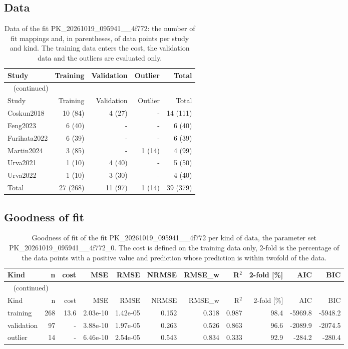 \subsection{Data}

\begin{longtable}{lrrrr}
\caption{Data of the fit PK\_20261019\_095941\_\_4f772: the number of fit mappings and, in parentheses, of data points per study and kind. The training data enters the cost, the validation data and the outliers are evaluated only.}\label{tab:data:PK_20261019_095941__4f772} \\
\toprule
Study & Training & Validation & Outlier & Total \\
\midrule
\endfirsthead
\multicolumn{5}{l}{\small\tablename~\thetable{} (continued)} \\
\toprule
Study & Training & Validation & Outlier & Total \\
\midrule
\endhead
\bottomrule
\endlastfoot
Coskun2018 & 10 (84) & 4 (27) & - & 14 (111) \\
Feng2023 & 6 (40) & - & - & 6 (40) \\
Furihata2022 & 6 (39) & - & - & 6 (39) \\
Martin2024 & 3 (85) & - & 1 (14) & 4 (99) \\
Urva2021 & 1 (10) & 4 (40) & - & 5 (50) \\
Urva2022 & 1 (10) & 3 (30) & - & 4 (40) \\
Total & 27 (268) & 11 (97) & 1 (14) & 39 (379) \\
\end{longtable}

\subsection{Goodness of fit}

\begin{longtable}{lrrrrrrrrrr}
\caption{Goodness of fit of the fit PK\_20261019\_095941\_\_4f772 per kind of data, the parameter set PK\_20261019\_095941\_\_4f772\_0. The cost is defined on the training data only, 2-fold is the percentage of the data points with a positive value and prediction whose prediction is within twofold of the data.}\label{tab:metrics:PK_20261019_095941__4f772} \\
\toprule
Kind & n & cost & MSE & RMSE & NRMSE & RMSE\_w & R\ensuremath{^{2}} & 2-fold [\%] & AIC & BIC \\
\midrule
\endfirsthead
\multicolumn{11}{l}{\small\tablename~\thetable{} (continued)} \\
\toprule
Kind & n & cost & MSE & RMSE & NRMSE & RMSE\_w & R\ensuremath{^{2}} & 2-fold [\%] & AIC & BIC \\
\midrule
\endhead
\bottomrule
\endlastfoot
training & 268 & 13.6 & 2.03e-10 & 1.42e-05 & 0.152 & 0.318 & 0.987 & 98.4 & -5969.8 & -5948.2 \\
validation & 97 & - & 3.88e-10 & 1.97e-05 & 0.263 & 0.526 & 0.863 & 96.6 & -2089.9 & -2074.5 \\
outlier & 14 & - & 6.46e-10 & 2.54e-05 & 0.543 & 0.834 & 0.333 & 92.9 & -284.2 & -280.4 \\
\end{longtable}

